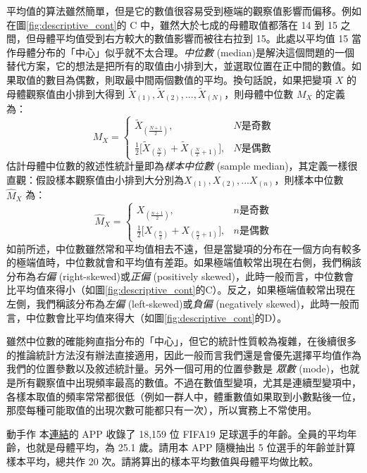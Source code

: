     平均值的算法雖然簡單，但是它的數值很容易受到極端的觀察值影響而偏移。例如在圖\ref{fig:descriptive_cont}的 C 中，雖然大於七成的母體取值都落在 14 到 15 之間，但母體平均值受到右方較大的數值影響而被往右拉到 15。此處以平均值 15 當作母體分布的「中心」似乎就不太合理。\textit{中位數} (median)是解決這個問題的一個替代方案，它的想法是把所有的取值由小排到大，並選取位置在正中間的數值。如果取值的數目為偶數，則取最中間兩個數值的平均。換句話說，如果把變項 $X$ 的母體觀察值由小排到大得到 $\tilde{X}_{(1)}, \tilde{X}_{(2)}, ..., \tilde{X}_{(N)}$，則母體中位數 $M_X$ 的定義為：
    \[M_X = \left\{\begin{array}{lr}
        \tilde{X}_{(\frac{N+1}{2})}, & N \text{是奇數}\\
        \frac{1}{2}\Big[\tilde{X}_{(\frac{N}{2})}+\tilde{X}_{(\frac{N}{2}+1)}\Big], & N \text{是偶數}
    \end{array}\right.\]
    估計母體中位數的敘述性統計量即為\textit{樣本中位數} (sample median)，其定義一樣很直觀：假設樣本觀察值由小排到大分別為$X_{(1)}, X_{(2)}, ... X_{(n)}$，則樣本中位數 $\hat{M}_X$ 為：
    \[\hat{M}_X = \left\{\begin{array}{lr}
        X_{(\frac{n+1}{2})}, & n \text{是奇數}\\
        \frac{1}{2}\Big[X_{(\frac{n}{2})}+X_{(\frac{n}{2}+1)}\Big], & n \text{是偶數}
    \end{array}\right.\]
    如前所述，中位數雖然常和平均值相去不遠，但是當變項的分布在一個方向有較多的極端值時，中位數就會和平均值有差距。如果極端值較常出現在右側，我們稱該分布為\textit{右偏} (right-skewed)或\textit{正偏} (positively skewed)，此時一般而言，中位數會比平均值來得小（如圖\ref{fig:descriptive_cont}的C）。反之，如果極端值較常出現在左側，我們稱該分布為\textit{左偏} (left-skewed)或\textit{負偏} (negatively skewed)，此時一般而言，中位數會比平均值來得大（如圖\ref{fig:descriptive_cont}的D）。
    
    雖然中位數的確能夠直指分布的「中心」，但它的統計性質較為複雜，在後續很多的推論統計方法沒有辦法直接適用，因此一般而言我們還是會優先選擇平均值作為我們的位置參數以及敘述統計量。另外一個可用的位置參數是 \textit{眾數} (mode)，也就是所有觀察值中出現頻率最高的數值。不過在數值型變項，尤其是連續型變項中，各樣本取值的頻率常常都很低（例如一群人中，體重數值如果取到小數點後一位，那麼每種可能取值的出現次數可能都只有一次），所以實務上不常使用。

    \bigskip

    \begin{custom}{動手作}
        本\href{https://istats.shinyapps.io/sampdist_cont/}{連結}的 APP 收錄了 18,159 位 FIFA19 足球選手的年齡。全員的平均年齡，也就是母體平均，為 25.1 歲。請用本 APP 隨機抽出 5 位選手的年齡並計算樣本平均，總共作 20 次。請將算出的樣本平均數值與母體平均做比較。
    \end{custom}

